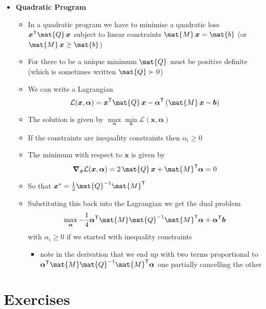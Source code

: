 \documentclass[11pt]{article}
\newcommand{\tr}{\textsf{T}}
\newcommand{\grad}{\bm{\nabla}}
\begin{document}
\begin{itemize}
\item \textbf{Quadratic Program}
\begin{itemize}
\item In a quadratic program we have to minimise a quadratic loss
\(\bm{x}^\tr \mat{Q}\,\bm{x}\) subject to linear constraints
\(\mat{M}\,\bm{x} =\mat{b}\) (or \(\mat{M}\,\bm{x} \geq \mat{b}\))
\item For there to be a unique minimum \(\mat{Q}\) must be positive
definite (which is sometimes written \(\mat{Q}\succ0\))
\item We can write a Lagrangian
$$ \mathcal{L}(\bm{x},\bm{\alpha}) = \bm{x}^\tr \mat{Q}\, \bm{x} -
      \bm{\alpha}^\tr \left( \mat{M}\,\bm{x} - \bm{b}\right) $$
\item The solution is given by  \(\max\limits_{\bm{\alpha}}
        \min\limits_{\bm{x}}  \mathcal{L}(\bm{x},\bm{\alpha})\)
\item If the constraints are inequality constraints then \(\alpha_i\geq0\)
\item The minimum with respect to \(\bm{x}\) is given by 
$$ \grad_{\bm{x}} \mathcal{L}(\bm{x},\bm{\alpha}) =  2\, \mat{Q}\,
        \bm{x} + \mat{M}^\tr \bm{\alpha} = 0 $$
\item So that \(\bm{x}^* = \frac{1}{2} \mat{Q}^{-1} \mat{M}^\tr\)
\item Substituting this back into the Lagrangian we get the dual problem
 $$ \max_{\bm{\alpha}}
      -\frac{1}{4} \bm{\alpha}^\tr \mat{M} \mat{Q}^{-1} \mat{M}^\tr
      \bm{\alpha} + \bm{\alpha}^\tr \bm{b} $$
with \(\alpha_i\geq0\) if we started with inequality constraints
\begin{itemize}
\item note in the derivation that we end up with two terms
proportional to \(\bm{\alpha}^\tr \mat{M} \mat{Q}^{-1} \mat{M}^\tr
          \bm{\alpha}\) one partially cancelling the other
\end{itemize}
\end{itemize}
\end{itemize}



\section{Exercises}
\label{sec:orgb7b2f70}
\end{document}
